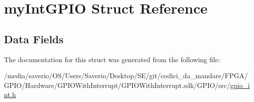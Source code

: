 \hypertarget{structmyIntGPIO}{}\section{my\+Int\+G\+P\+IO Struct Reference}
\label{structmyIntGPIO}
\subsection*{Data Fields}


The documentation for this struct was generated from the following file\+:\begin{DoxyCompactItemize}
\item 
/media/saverio/\+O\+S/\+Users/\+Saverio/\+Desktop/\+S\+E/git/codici\+\_\+da\+\_\+mandare/\+F\+P\+G\+A/\+G\+P\+I\+O/\+Hardware/\+G\+P\+I\+O\+With\+Interrupt/\+G\+P\+I\+O\+With\+Interrupt.\+sdk/\+G\+P\+I\+O/src/\hyperlink{gpio__int_8h}{gpio\+\_\+int.\+h}\end{DoxyCompactItemize}
